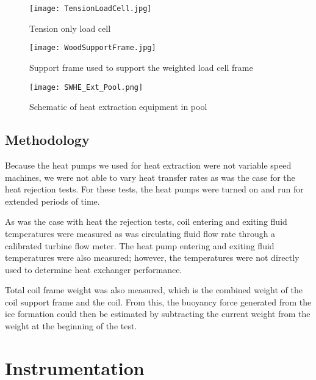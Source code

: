 	\begin{figure}
		\centering
		\texttt{[image: TensionLoadCell.jpg]}
		\caption[Tension only load cell]{Tension only load cell}
		\label{fig:ExpMethod:HeatExtr:Apparatus:TensionLoadCell}
	\end{figure}


	\begin{figure}
		\centering
		\texttt{[image: WoodSupportFrame.jpg]}
		\caption[Support frame used to support the weighted load cell frame]{Support frame used to support the weighted load cell frame}
		\label{fig:ExpMethod:HeatExtr:Apparatus:WoodSupportFrame}
	\end{figure}


	\begin{figure}
		\centering
		\texttt{[image: SWHE\_Ext\_Pool.png]}
		\caption[Schematic of heat extraction equipment in pool]{Schematic of heat extraction equipment in pool}
		\label{fig:ExpMethod:HeatExtr:Apparatus:ExtrExpPool}
	\end{figure}

	\subsection{Methodology}
	\label{subsec:ExpMethod:HeatExtr:Method}

Because the heat pumps we used for heat extraction were not variable speed machines, we were not able to vary heat transfer rates as was the case for the heat rejection tests. For these tests, the heat pumps were turned on and run for extended periods of time.

As was the case with heat the rejection tests, coil entering and exiting fluid temperatures were measured as was circulating fluid flow rate through a calibrated turbine flow meter. The heat pump entering and exiting fluid temperatures were also measured; however, the temperatures were not directly used to determine heat exchanger performance.

Total coil frame weight was also measured, which is the combined weight of the coil support frame and the coil. From this, the buoyancy force generated from the ice formation could then be estimated by subtracting the current weight from the weight at the beginning of the test.

\section{Instrumentation}
\label{sec:ExpMethod:Instr}

